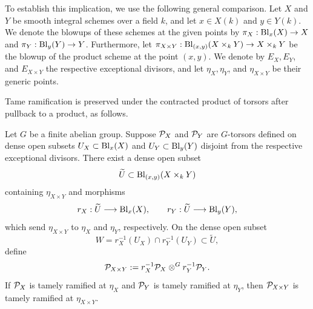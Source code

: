 To establish this implication, we use the following general comparison. Let
$X$ and $Y$ be smooth integral schemes over a field $k$, and let
$x\in X(k)$ and $y\in Y(k)$.
We denote the blowups of these schemes at the given points by
$\pi_X: \operatorname{Bl}_x(X) \to X$ and $\pi_Y: \operatorname{Bl}_y(Y) \to Y$. Furthermore, let $\pi_{X \times Y}: \operatorname{Bl}_{(x,y)}(X \times_k Y) \to X \times_k Y$
be the blowup of the product scheme at the point $(x,y)$.
We denote by $E_X, E_Y$, and $E_{X \times Y}$ the respective exceptional divisors, and let $\eta_X, \eta_Y$, and $\eta_{X \times Y}$ be their generic points.

Tame ramification is preserved under the contracted product of torsors after
pullback to a product, as follows.

\begin{prop}\label{prop:ramification-external-product}
Let $G$ be a finite abelian group. Suppose $\mathcal{P}_X$ and $\mathcal{P}_Y$ are
$G$-torsors defined on dense open subsets
$U_X\subset\operatorname{Bl}_x(X)$ and $U_Y\subset\operatorname{Bl}_y(Y)$ disjoint from the respective
exceptional divisors. There exist a dense open subset
\[
    \widetilde U\subset\operatorname{Bl}_{(x,y)}(X\times_kY)
\]
containing $\eta_{X\times Y}$ and morphisms
\[
    r_X:\widetilde U\longrightarrow\operatorname{Bl}_x(X),
    \qquad
    r_Y:\widetilde U\longrightarrow\operatorname{Bl}_y(Y),
\]
which send $\eta_{X\times Y}$ to $\eta_X$ and $\eta_Y$, respectively. On
the dense open subset
\[
    W=r_X^{-1}(U_X)\cap r_Y^{-1}(U_Y)\subset\widetilde U,
\]
define
\[
    \mathcal{P}_{X\times Y}
      :=r_X^{-1}\mathcal{P}_X
        \otimes^G
        r_Y^{-1}\mathcal{P}_Y.
\]
If $\mathcal{P}_X$ is tamely ramified at $\eta_X$ and $\mathcal{P}_Y$ is tamely ramified
at $\eta_Y$, then $\mathcal{P}_{X\times Y}$ is tamely ramified at
$\eta_{X\times Y}$.
\end{prop}

